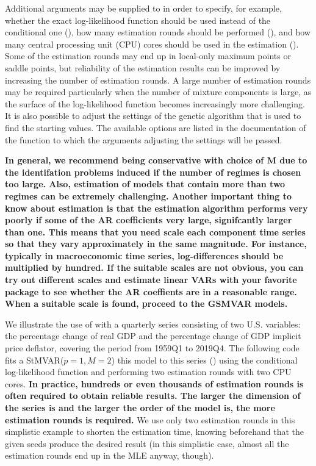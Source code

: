 \documentclass[nojss]{jss} %
\begin{document}
Additional arguments may be supplied to  in order to specify, for example, whether the exact log-likelihood function should be used instead of the conditional one (), how many estimation rounds should be performed (), and how many central processing unit (CPU) cores should be used in the estimation (). Some of the estimation rounds may end up in local-only maximum points or saddle points, but reliability of the estimation results can be improved by increasing the number of estimation rounds. A large number of estimation rounds may be required particularly when the number of mixture components is large, as the surface of the log-likelihood function becomes increasingly more challenging. It is also possible to adjust the settings of the genetic algorithm that is used to find the starting values. The available options are listed in the documentation of the function  to which the arguments adjusting the settings will be passed.

\textbf{In general, we recommend being conservative with choice of M due to the identifation problems induced if the number of regimes is chosen too large. Also, estimation of models that contain more than two regimes can be extremely challenging. Another important thing to know about estimation is that the estimation algorithm performs very poorly if some of the AR coefficients very large, signifcantly larger than one. This means that you need scale each component time series so that they vary approximately in the same magnitude. For instance, typically in macroeconomic time series, log-differences should be multiplied by hundred. If the suitable scales are not obvious, you can try out different scales and estimate linear VARs with your favorite package to see whether the AR coeffients are in a reasonable range. When a suitable scale is found, proceed to the GSMVAR models.}

We illustrate the use of  with a quarterly series consisting of two U.S. variables: the percentage change of real GDP and the percentage change of GDP implicit price deflator, covering the period from 1959Q1 to 2019Q4. The following code fits a StMVAR($p=1,M=2$) this model to this series () using the conditional log-likelihood function and performing two estimation rounds with two CPU cores. \textbf{In practice, hundreds or even thousands of estimation rounds is often required to obtain reliable results. The larger the dimension of the series is and the larger the order of the model is, the more estimation rounds is required.} We use only two estimation rounds in this simplistic example to shorten the estimation time, knowing beforehand that the given seeds produce the desired result (in this simplistic case, almost all the estimation rounds end up in the MLE anyway, though).
\end{document}
